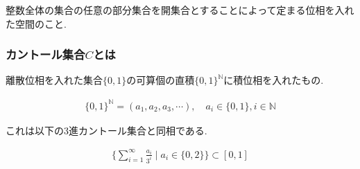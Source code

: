 \documentclass[i]{jsarticle}
\begin{document}
整数全体の集合の任意の部分集合を開集合とすることによって定まる位相を入れた空間のこと.

\subsubsection*{カントール集合$C$とは}

離散位相を入れた集合$\{0, 1\}$の可算個の直積$\{0, 1\}^{\mathbb{N}}$に積位相を入れたもの.

\begin{align*}
\{0, 1\}^{\mathbb{N}} = (a_{1}, a_{2}, a_{3}, \cdots ),  \quad a_{i} \in \{0, 1\}, i \in \mathbb{N}
\end{align*}

これは以下の3進カントール集合と同相である.

\begin{align*}
\{\sum _{i=1}^{\infty} \frac{a_{i}}{3^{i}} \mid a_{i} \in \{0, 2\}\} \subset [0, 1]
\end{align*}
\end{document}

